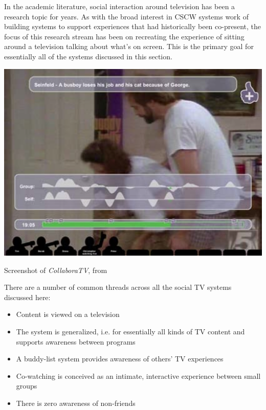 In the academic literature, social interaction around television has been a research topic for years. As with the broad interest in CSCW systems work of building systems to support experiences that had historically been co-present, the focus of this research stream has been on recreating the experience of sitting around a television talking about what's on screen. This is the primary goal for essentially all of the systems discussed in this section. 

\begin{marginfigure}
	\includegraphics{figures/roar/collaboraTV.png}
	\caption{Screenshot of \emph{CollaboraTV}, from \citep{harrison2007collaboratv}}
	\label{fig:collaboratv}
\end{marginfigure}


There are a number of common threads across all the social TV systems discussed here:

\begin{itemize}
	\item Content is viewed on a television
	\item The system is generalized, i.e. for essentially all kinds of TV content and supports awareness between programs
	\item A buddy-list system provides awareness of others' TV experiences
	\item Co-watching is conceived as an intimate, interactive experience between small groups
	\item There is zero awareness of non-friends 
\end{itemize}




